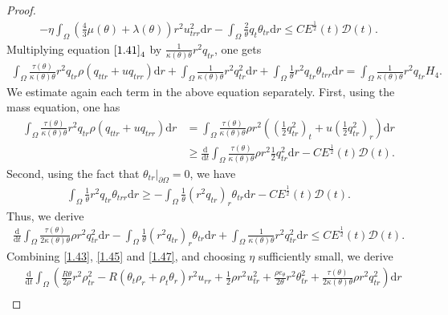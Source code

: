 \documentclass[11pt,reqno]{amsart}
\numberwithin{equation}{section}
\newcommand{\dif}{\mathrm{d}}
\begin{document}
\begin{proof}
\begin{align}
- \eta \int_{\Omega} \left(\frac{4}{3}\mu(\theta)+\lambda(\theta)\right) r^2u_{trr}^2 \dif r -\int_{\Omega} \frac{2}{\theta} q_t \theta_{tr} \dif r \le C E^\frac{1}{2}(t) \mathcal D(t). \label{1.45}
 \end{align}
 Multiplying equation $\eqref{1.41}_4$ by $\frac{1}{\kappa(\theta)\theta} r^2 q_{tr}$, one gets
 \begin{align}
 \int_{\Omega} \frac{\tau(\theta) }{\kappa(\theta)\theta} r^2 q_{tr} \rho (q_{ttr} + u q_{trr} )\dif r +\int_{\Omega} \frac{1}{\kappa(\theta)\theta}r^2 q_{tr}^2 \dif r+\int_{\Omega} \frac{1}{\theta} r^2 q_{tr} \theta_{trr} \dif r=\int_{\Omega} \frac{1}{\kappa(\theta)\theta} r^2 q_{tr} H_4.
 \end{align}
 We estimate again each term in the above equation separately.
First, using the mass equation, one has
 \begin{align*}
  \int_{\Omega} \frac{\tau(\theta)}{\kappa(\theta)\theta}  r^2  q_{tr} \rho( q_{ttr}+u q_{trr}) \dif r&= \int_{\Omega} \frac{\tau(\theta)}{\kappa(\theta)\theta} \rho r^2 ( (\frac{1}{2} q_{tr}^2)_t+u (\frac{1}{2}q_{tr}^2)_r) \dif r\\
  &\ge \frac{\dif}{\dif t} \int_{\Omega} \frac{\tau(\theta)}{\kappa(\theta)\theta} \rho r^2  \frac{1}{2} q_{tr}^2 \dif r -CE^\frac{1}{2}(t) \mathcal D(t).
  \end{align*}
 Second, using the fact that $\theta_{tr}|_{\partial \Omega}=0$, we have
 \begin{align*}
 \int_{\Omega} \frac{1}{\theta} r^2 q_{tr}\theta_{trr}   \dif r \ge -\int_{\Omega} \frac{1}{\theta} (r^2 q_{tr})_r  \theta_{tr} \dif r -CE^\frac{1}{2}(t) \mathcal D(t).
 \end{align*}
 Thus, we derive
 \begin{align}\label{1.47}
 \frac{\dif}{\dif t} \int_{\Omega} \frac{\tau(\theta)}{2\kappa(\theta)\theta} \rho r^2 q_{tr}^2 \dif r -\int_{\Omega} \frac{1}{\theta} (r^2 q_{tr})_r \theta_{tr} \dif r+\int_{\Omega} \frac{1}{\kappa(\theta)\theta} r^2 q_{tr}^2 \dif r \le CE^\frac{1}{2}(t) \mathcal D(t).
 \end{align}
Combining \eqref{1.43}, \eqref{1.45} and \eqref{1.47}, and choosing $\eta$ sufficiently small, we derive
\begin{align}
  &\frac{\dif}{\dif t} \int_{\Omega} \left( \frac{R\theta}{2\rho} r^2 \rho_{tr}^2 -R(\theta_t \rho_r+\rho_t\theta_r)r^2u_{rr}+\frac{1}{2}\rho r^2 u_{tr}^2+\frac{\rho e_\theta}{2\theta} r^2 \theta_{tr}^2+\frac{\tau(\theta)}{2\kappa(\theta)\theta} \rho r^2 q_{tr}^2 \right)\dif r \nonumber \\

\end{align}
\end{proof}
\end{document}
